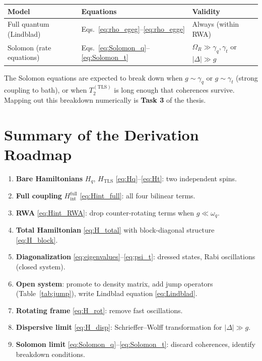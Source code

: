\documentclass[12pt,a4paper]{article}
\newcommand{\wq}{\omega_q}
\newcommand{\D}{\Delta}
\begin{document}
\begin{center}
\renewcommand{\arraystretch}{1.5}
\begin{tabular}{lll}
\toprule
Model & Equations & Validity \\
\midrule
Full quantum (Lindblad) & Eqs.~\eqref{eq:rho_egeg}--\eqref{eq:rho_egge} & Always (within RWA) \\
Solomon (rate equations) & Eqs.~\eqref{eq:Solomon_q}--\eqref{eq:Solomon_t}
  & $\Omega_R \gg \gamma_q,\gamma_t$ or $|\D| \gg g$ \\
\bottomrule
\end{tabular}
\end{center}

The Solomon equations are expected to break down when
$g \sim \gamma_q$ or $g \sim \gamma_t$ (strong coupling to bath), or
when $T_2^{(\mathrm{TLS})}$ is long enough that coherences survive.
Mapping out this breakdown numerically is \textbf{Task 3} of the thesis.

\section{Summary of the Derivation Roadmap}

\begin{enumerate}
  \item \textbf{Bare Hamiltonians} $H_q$, $H_{\mathrm{TLS}}$
        \eqref{eq:Hq}--\eqref{eq:Ht}: two independent spins.
  \item \textbf{Full coupling} $H_{\mathrm{int}}^{\mathrm{full}}$
        \eqref{eq:Hint_full}: all four bilinear terms.
  \item \textbf{RWA} \eqref{eq:Hint_RWA}: drop counter-rotating terms
        when $g \ll \wq$.
  \item \textbf{Total Hamiltonian} \eqref{eq:H_total} with block-diagonal
        structure \eqref{eq:H_block}.
  \item \textbf{Diagonalization} \eqref{eq:eigenvalues}--\eqref{eq:psi_t}:
        dressed states, Rabi oscillations (closed system).
  \item \textbf{Open system}: promote to density matrix, add jump operators
        (Table~\ref{tab:jump}), write Lindblad equation \eqref{eq:Lindblad}.
  \item \textbf{Rotating frame} \eqref{eq:H_rot}: remove fast oscillations.
  \item \textbf{Dispersive limit} \eqref{eq:H_disp}: Schrieffer--Wolff
        transformation for $|\D| \gg g$.
  \item \textbf{Solomon limit} \eqref{eq:Solomon_q}--\eqref{eq:Solomon_t}:
        discard coherences, identify breakdown conditions.
\end{enumerate}
\end{document}
